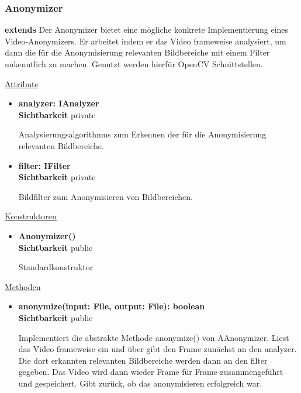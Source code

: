\subsubsection{Anonymizer} \label{service:klasse:Anonymizer}
\textbf{extends}  \newline
Der Anonymizer bietet eine mögliche konkrete Implementierung eines Video-Anonymizers. Er arbeitet indem er das Video frameweise analysiert, um dann die für die Anonymisierung relevanten Bildbereiche mit einem Filter unkenntlich zu machen. Genutzt werden hierfür OpenCV Schnittstellen.\newline

\underline{Attribute}
\begin{itemize}
\itemsep0pt
\item \textbf{analyzer: IAnalyzer} \hfill\\ 
\textbf{Sichtbarkeit} private

Analysierungsalgorithmus zum Erkennen der für die Anonymisierung relevanten Bildbereiche.

\item \textbf{filter: IFilter} \hfill\\ 
\textbf{Sichtbarkeit} private

Bildfilter zum Anonymisieren von Bildbereichen.
\end{itemize}

\underline{Konstruktoren}
\begin{itemize}
\itemsep0pt
\item \textbf{Anonymizer()} \hfill\\
\textbf{Sichtbarkeit} public

Standardkonstruktor
\end{itemize}

\underline{Methoden}
\begin{itemize}
\itemsep0pt
\item \textbf{anonymize(input: File, 
output: File): boolean}\hfill\\
\textbf{Sichtbarkeit} public

Implementiert die abstrakte Methode anonymize() von AAnonymizer. Liest das Video frameweise ein und über gibt den Frame zunächst an den analyzer. Die dort erkannten relevanten Bildbereiche werden dann an den filter gegeben. Das Video wird dann wieder Frame für Frame zusammengeführt und gespeichert. Gibt zurück, ob das anonymisieren erfolgreich war.

\end{itemize}